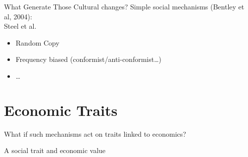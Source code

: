 \documentclass[12pt, notes=show]{beamer}
\begin{document}
\begin{frame}{What Generate Those Cultural changes?}
	Simple social mechanisms (Bentley et al, 2004):\\
	Steel et al.
	\begin{itemize}
		\item<2->Random Copy 
		\item<3-> Frequency biased (conformist/anti-conformist\dots)
		\item<4->\dots	
	\end{itemize}
\end{frame}

\section{Economic Traits}


\begin{frame}
	\begin{center}
	    What if such mechanisms act on traits linked to economics?
	\end{center}
\end{frame}

\begin{frame}{A social trait and economic value}
	\begin{center}
	\end{center}
\end{frame}
\end{document}
